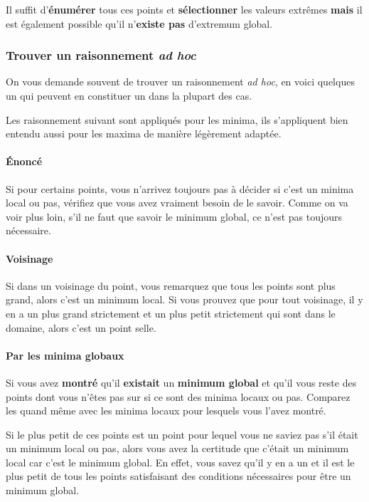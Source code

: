 \documentclass[11pt,a4paper]{article}
\theoremstyle{definition}
\begin{document}
Il suffit d'\textbf{énumérer} tous ces points et \textbf{sélectionner} les valeurs extrêmes
\textbf{mais} il est également possible qu'il n'\textbf{existe pas} d'extremum global.

\subsubsection{Trouver un raisonnement \emph{ad hoc}}
On vous demande souvent de trouver un raisonnement \emph{ad hoc}, en voici quelques un qui peuvent en constituer un dans la plupart des cas.

Les raisonnement suivant sont appliqués pour les minima, ils s'appliquent bien entendu aussi pour les maxima de manière légèrement adaptée.

\paragraph{Énoncé}
Si pour certains points, vous n'arrivez toujours pas à décider si c'est un minima local ou pas,
vérifiez que vous avez vraiment besoin de le savoir.
Comme on va voir plus loin, s'il ne faut que savoir le minimum global, ce n'est pas toujours nécessaire.

\paragraph{Voisinage}
Si dans un voisinage du point, vous remarquez que tous les points sont plus grand, alors c'est un minimum local.
Si vous prouvez que pour tout voisinage, il y en a un plus grand strictement et un plus petit strictement qui sont dans le domaine,
alors c'est un point selle.

\paragraph{Par les minima globaux}
Si vous avez \textbf{montré} qu'il \textbf{existait} un \textbf{minimum global}
et qu'il vous reste des points dont vous n'êtes pas sur si ce sont des minima locaux ou pas.
Comparez les quand même avec les minima locaux pour lesquels vous l'avez montré.

Si le plus petit de ces points est un point pour lequel vous ne saviez pas s'il était un minimum local ou pas,
alors vous avez la certitude que c'était un minimum local car c'est le minimum global.
En effet, vous savez qu'il y en a un
et il est le plus petit de tous les points satisfaisant des conditions nécessaires pour être un minimum global.
\end{document}
